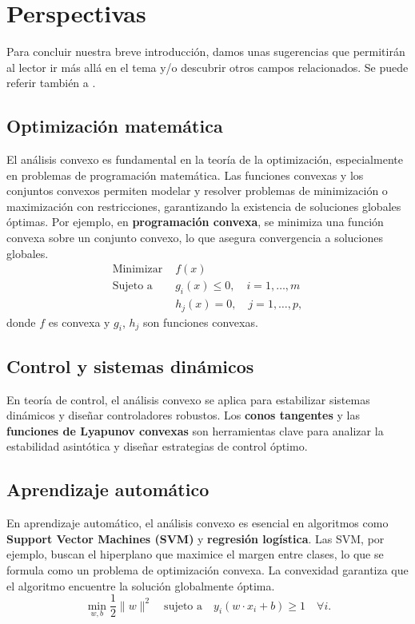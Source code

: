 \documentclass[12pt]{book}
\theoremstyle{definition}
\theoremstyle{plain}
\theoremstyle{remark}
\begin{document}
\chapter{Perspectivas}
\label{ch:conclusion}

Para concluir nuestra breve introducción, damos unas sugerencias que permitirán al lector ir más allá en el tema y/o descubrir otros campos relacionados. Se puede referir tambi\'en a \cite{bertsekas1982}.

\section{Optimización matemática}
El análisis convexo es fundamental en la teoría de la optimización, especialmente en problemas de programación matemática. Las funciones convexas y los conjuntos convexos permiten modelar y resolver problemas de minimización o maximización con restricciones, garantizando la existencia de soluciones globales óptimas. Por ejemplo, en \textbf{programación convexa}, se minimiza una función convexa sobre un conjunto convexo, lo que asegura convergencia a soluciones globales.
\begin{align*}
    \text{Minimizar } & f(x) \\
    \text{Sujeto a } & g_i(x) \leq 0, \quad i = 1, \dots, m \\
                     & h_j(x) = 0, \quad j = 1, \dots, p,
\end{align*}
donde \( f \) es convexa y \( g_i \), \( h_j \) son funciones convexas.

\section{Control y sistemas dinámicos}
En teoría de control, el análisis convexo se aplica para estabilizar sistemas dinámicos y diseñar controladores robustos. Los \textbf{conos tangentes} y las \textbf{funciones de Lyapunov convexas} son herramientas clave para analizar la estabilidad asintótica y diseñar estrategias de control óptimo.

\section{Aprendizaje automático}
En aprendizaje automático, el análisis convexo es esencial en algoritmos como \textbf{Support Vector Machines (SVM)} y \textbf{regresión logística}. Las SVM, por ejemplo, buscan el hiperplano que maximice el margen entre clases, lo que se formula como un problema de optimización convexa. La convexidad garantiza que el algoritmo encuentre la solución globalmente óptima.
\begin{equation*}
    \min_{w, b} \frac{1}{2} \|w\|^2 \quad \text{sujeto a} \quad y_i (w \cdot x_i + b) \geq 1 \quad \forall i.
\end{equation*}
\end{document}
